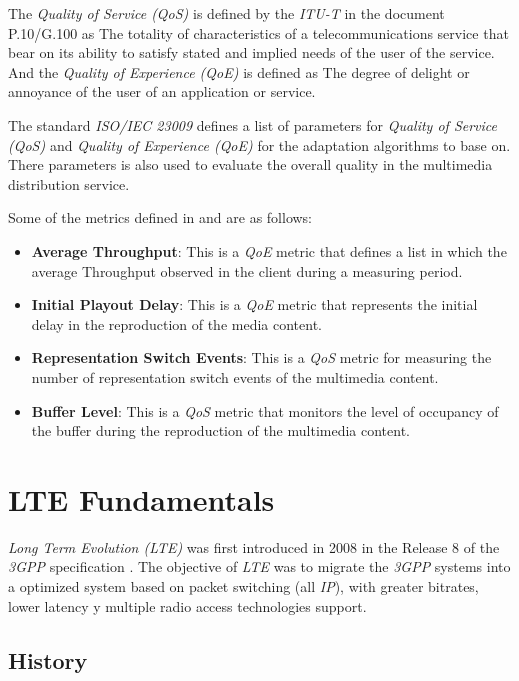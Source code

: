 The \textit{Quality of Service (QoS)} is defined by the \textit{ITU-T} in the document P.10/G.100
 \cite{itu2} as \textquotedbl The totality of characteristics of a telecommunications service that bear on its 
 ability to satisfy stated and implied needs of the user of the service\textquotedbl. And the \textit{Quality of 
Experience (QoE)} is defined as \textquotedbl The degree of delight or annoyance of the user of an application or service\textquotedbl.

The standard \textit{ISO/IEC 23009} defines a list of parameters for \textit{Quality of Service (QoS)} and
\textit{Quality of Experience (QoE)} for the adaptation algorithms to base on. There parameters 
is also used to evaluate the overall quality in the multimedia distribution service.

Some of the metrics defined in \cite{3gpp1} and \cite{ISO23009} are as follows:

\begin{itemize}
  \item \textbf{Average Throughput}: This is a \textit{QoE} metric that defines a list in which 
  the average Throughput observed in the client during a measuring period.
  \item \textbf{Initial Playout Delay}: This is a \textit{QoE} metric that represents the initial 
  delay in the reproduction of the media content.
  \item \textbf{Representation Switch Events}: This is a \textit{QoS} metric for measuring the 
  number of representation switch events of the multimedia content.
  \item \textbf{Buffer Level}: This is a \textit{QoS} metric that monitors the level of occupancy
  of the buffer during the reproduction of the multimedia content.
\end{itemize}


\section{LTE Fundamentals}
\label{sec:4g}

\textit{Long Term Evolution (LTE)} was first introduced in 2008 in the Release 8 of the \textit{3GPP}
specification \cite{lte1}. The objective of \textit{LTE} was to migrate the \textit{3GPP} systems
into a optimized system based on packet switching (all \textit{IP}), with greater bitrates, lower
latency y multiple radio access technologies support.

\subsection{History}
\label{sec:4gintro}

